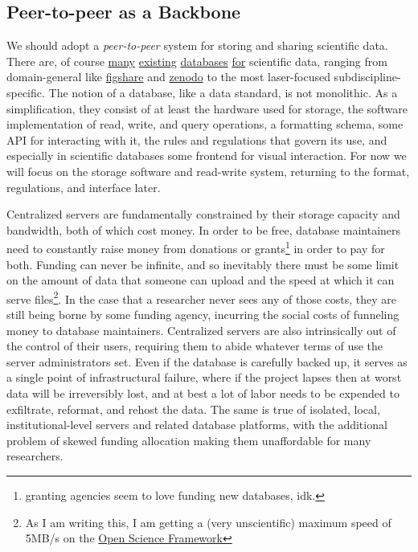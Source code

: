 \documentclass[notoc]{tufte-book}
\begin{document}
\subsection{Peer-to-peer as a
Backbone}

We should adopt a \emph{peer-to-peer} system for storing and sharing
scientific data. There are, of course
\href{https://www.dandiarchive.org/}{many}
\href{https://openneuro.org/}{existing}
\href{https://www.brainminds.riken.jp/}{databases}
\href{https://biccn.org/}{for} scientific data, ranging from
domain-general like \href{https://figshare.com/}{figshare} and
\href{https://zenodo.org/}{zenodo} to the most laser-focused
subdiscipline-specific. The notion of a database, like a data standard,
is not monolithic. As a simplification, they consist of at least the
hardware used for storage, the software implementation of read, write,
and query operations, a formatting schema, some API for interacting with
it, the rules and regulations that govern its use, and especially in
scientific databases some frontend for visual interaction. For now we
will focus on the storage software and read-write system, returning to
the format, regulations, and interface later.

Centralized servers are fundamentally constrained by their storage
capacity and bandwidth, both of which cost money. In order to be free,
database maintainers need to constantly raise money from donations or
grants\footnote{granting agencies seem to love funding new databases,
  idk.} in order to pay for both. Funding can never be infinite, and so
inevitably there must be some limit on the amount of data that someone
can upload and the speed at which it can serve files\footnote{As I am
  writing this, I am getting a (very unscientific) maximum speed of
  5MB/s on the \href{https://osf.io}{Open Science Framework}}. In the
case that a researcher never sees any of those costs, they are still
being borne by some funding agency, incurring the social costs of
funneling money to database maintainers. Centralized servers are also
intrinsically out of the control of their users, requiring them to abide
whatever terms of use the server administrators set. Even if the
database is carefully backed up, it serves as a single point of
infrastructural failure, where if the project lapses then at worst data
will be irreversibly lost, and at best a lot of labor needs to be
expended to exfiltrate, reformat, and rehost the data. The same is true
of isolated, local, institutional-level servers and related database
platforms, with the additional problem of skewed funding allocation
making them unaffordable for many researchers.
\end{document}
